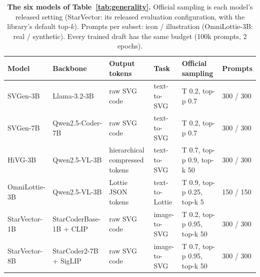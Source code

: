 \begin{table}[t]
\caption{\textbf{The six models of Table~\ref{tab:generality}.} Official sampling is each model's released setting (StarVector: its released evaluation configuration, with the library's default top-$k$). Prompts per subset: icon / illustration (OmniLottie-3B: real / synthetic). Every trained draft has the same budget (100k prompts, 2 epochs).}
\label{app:t3-settings}
\centering
\footnotesize
\begin{tabular*}{\textwidth}{@{\extracolsep{\fill}}llllll@{}}
\toprule
Model & Backbone & Output tokens & Task & Official sampling & Prompts \\
\midrule
SVGen-3B & Llama-3.2-3B & raw SVG code & text-to-SVG & T 0.2, top-p 0.7 & 300 / 300 \\
SVGen-7B & Qwen2.5-Coder-7B & raw SVG code & text-to-SVG & T 0.2, top-p 0.7 & 300 / 300 \\
HiVG-3B & Qwen2.5-VL-3B & hierarchical compressed tokens & text-to-SVG & T 0.7, top-p 0.9, top-k 50 & 300 / 300 \\
OmniLottie-3B & Qwen2.5-VL-3B & Lottie JSON tokens & text-to-Lottie & T 0.9, top-p 0.25, top-k 5 & 150 / 150 \\
StarVector-1B & StarCoderBase-1B + CLIP & raw SVG code & image-to-SVG & T 0.2, top-p 0.95, top-k 50 & 300 / 300 \\
StarVector-8B & StarCoder2-7B + SigLIP & raw SVG code & image-to-SVG & T 0.7, top-p 0.95, top-k 50 & 300 / 300 \\
\bottomrule
\end{tabular*}
\end{table}
